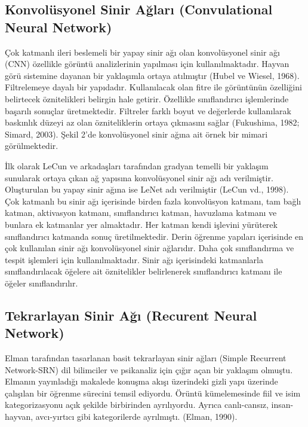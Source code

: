 \documentclass{article}
\begin{document}
\newpage
\begin{multicols}{2}
    

\subsection{Konvolüsyonel Sinir Ağları (Convulational Neural Network)}
Çok katmanlı ileri beslemeli bir yapay sinir ağı
olan konvolüsyonel sinir ağı (CNN) özellikle
görüntü analizlerinin yapılması için
kullanılmaktadır. Hayvan görü sistemine
dayanan bir yaklaşımla ortaya atılmıştır (Hubel
ve Wiesel, 1968). Filtrelemeye dayalı bir
yapıdadır. Kullanılacak olan fitre ile görüntünün
özelliğini belirtecek öznitelikleri belirgin hale
getirir. Özellikle sınıflandırıcı işlemlerinde
başarılı sonuçlar üretmektedir. Filtreler farklı
boyut ve değerlerde kullanılarak baskınlık düzeyi
az olan özniteliklerin ortaya çıkmasını sağlar
(Fukushima, 1982; Simard, 2003). Şekil 2’de
konvolüsyonel sinir ağına ait örnek bir mimari
görülmektedir.

İlk olarak LeCun ve arkadaşları tarafından
gradyan temelli bir yaklaşım sunularak ortaya
çıkan ağ yapısına konvolüsyonel sinir ağı adı
verilmiştir. Oluşturulan bu yapay sinir ağına ise
LeNet adı verilmiştir (LeCun vd., 1998).
Çok katmanlı bu sinir ağı içerisinde birden fazla
konvolüsyon katmanı, tam bağlı katman,
aktivasyon katmanı, sınıflandırıcı katman,
havuzlama katmanı ve bunlara ek katmanlar yer
almaktadır. Her katman kendi işlevini yürüterek
sınıflandırıcı katmanda sonuç üretilmektedir.
Derin öğrenme yapıları içerisinde en çok
kullanılan sinir ağı konvolüsyonel sinir ağlarıdır.
Daha çok sınıflandırma ve tespit işlemleri için
kullanılmaktadır. Sinir ağı içerisindeki
katmanlarla sınıflandırılacak öğelere ait
öznitelikler belirlenerek sınıflandırıcı katmanı ile
öğeler sınıflandırılır.

\subsection{Tekrarlayan Sinir Ağı (Recurent Neural Network)}
Elman tarafından tasarlanan basit tekrarlayan
sinir ağları (Simple Recurrent Network-SRN) dil
bilimciler ve psikanaliz için çığır açan bir
yaklaşım olmuştu. Elmanın yayınladığı
makalede konuşma akışı üzerindeki gizli yapı
üzerinde çalışılan bir öğrenme sürecini temsil
ediyordu. Örüntü kümelemesinde fiil ve isim
kategorizasyonu açık şekilde birbirinden
ayrılıyordu. Ayrıca canlı-cansız, insan-hayvan,
avcı-yırtıcı gibi kategorilerde ayrılmıştı. (Elman,
1990). 


\end{multicols}
\end{document}
